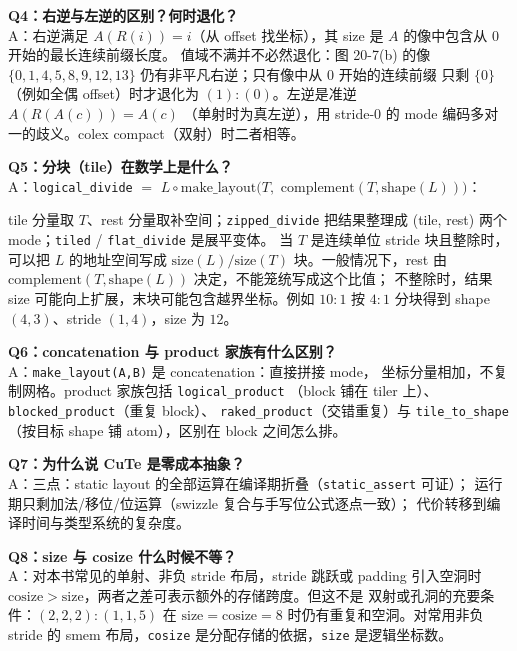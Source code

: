 \textbf{Q4：右逆与左逆的区别？何时退化？}\\
A：右逆满足 $A(R(i))=i$（从 offset 找坐标），其 size 是 $A$ 的像中包含从 0 开始的最长连续前缀长度。
值域不满并不必然退化：图 20-7(b) 的像 $\{0,1,4,5,8,9,12,13\}$ 仍有非平凡右逆；只有像中从 0 开始的连续前缀
只剩 $\{0\}$（例如全偶 offset）时才退化为 $(1){:}(0)$。左逆是准逆 $A(R(A(c)))=A(c)$
（单射时为真左逆），用 stride-0 的 mode 编码多对一的歧义。colex compact（双射）时二者相等。

\textbf{Q5：分块（tile）在数学上是什么？}\\
A：\texttt{logical\_\allowbreak{}divide} $=$
$L\circ\mathrm{make\_layout}\bigl(T,$
$\mathrm{complement}(T,\mathrm{shape}(L))\bigr)$：
\begin{sloppypar}
tile 分量取 $T$、rest 分量取补空间；\texttt{zipped\_\allowbreak{}divide} 把结果整理成
(tile, rest) 两个 mode；\texttt{tiled} / \texttt{flat\_divide} 是展平变体。
当 $T$ 是连续单位 stride 块且整除时，可以把 $L$ 的地址空间写成
$\mathrm{size}(L)/\mathrm{size}(T)$ 块。一般情况下，rest 由
$\mathrm{complement}(T,\mathrm{shape}(L))$ 决定，不能笼统写成这个比值；
不整除时，结果 size 可能向上扩展，末块可能包含越界坐标。例如
$10{:}1$ 按 $4{:}1$ 分块得到 shape $(4,3)$、stride $(1,4)$，size 为 $12$。
\end{sloppypar}

\textbf{Q6：concatenation 与 product 家族有什么区别？}\\
A：\texttt{make\_\allowbreak{}layout(A,B)} 是 concatenation：直接拼接 mode，
坐标分量相加，不复制网格。product 家族包括 \texttt{logical\_\allowbreak{}product}
（block 铺在 tiler 上）、\texttt{blocked\_\allowbreak{}product}（重复 block）、
\texttt{raked\_\allowbreak{}product}（交错重复）与 \texttt{tile\_\allowbreak{}to\_\allowbreak{}shape}
（按目标 shape 铺 atom），区别在 block 之间怎么排。

\textbf{Q7：为什么说 CuTe 是零成本抽象？}\\
A：三点：static layout 的全部运算在编译期折叠（\texttt{static\_\allowbreak{}assert} 可证）；
运行期只剩加法/移位/位运算（swizzle 复合与手写位公式逐点一致）；
代价转移到编译时间与类型系统的复杂度。

\textbf{Q8：size 与 cosize 什么时候不等？}\\
A：对本书常见的单射、非负 stride 布局，stride 跳跃或 padding 引入空洞时
$\mathrm{cosize}>\mathrm{size}$，两者之差可表示额外的存储跨度。但这不是
双射或孔洞的充要条件：$(2,2,2){:}(1,1,5)$ 在
$\mathrm{size}=\mathrm{cosize}=8$ 时仍有重复和空洞。对常用非负 stride 的
smem 布局，\texttt{cosize} 是分配存储的依据，\texttt{size} 是逻辑坐标数。

